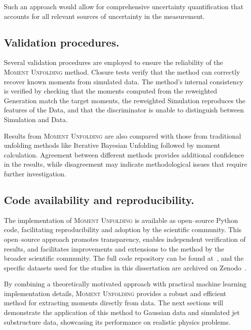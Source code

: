         Such an approach would allow for comprehensive uncertainty quantification that accounts for all relevant sources of uncertainty in the measurement.
    \subsection{Validation procedures.}
        Several validation procedures are employed to ensure the reliability of the \textsc{Moment Unfolding} method.
        Closure tests verify that the method can correctly recover known moments from simulated data.
        The method's internal consistency is verified by checking that the moments computed from the reweighted Generation match the target moments,
        the reweighted Simulation reproduces the features of the Data, and
        that the discriminator is unable to distinguish between Simulation and Data.
        
        Results from \textsc{Moment Unfolding} are also compared with those from traditional unfolding methods like Iterative Bayesian Unfolding followed by moment calculation.
        Agreement between different methods provides additional confidence in the results, while disagreement may indicate methodological issues that require further investigation.
    \subsection{Code availability and reproducibility.}
        The implementation of \textsc{Moment Unfolding} is available as open--source Python code, facilitating reproducibility and adoption by the scientific community.
        This open--source approach promotes transparency, enables independent verification of results, and facilitates improvements and extensions to the method by the broader scientific community.
        The full code repository can be found at~\cite{HEP-GAN/MomentUnfolding:Method}, and the specific datasets used for the studies in this dissertation are archived on Zenodo~\cite{AndreassenPythia/HerwigUnfolding}.

    By combining a theoretically motivated approach with practical machine learning implementation details, \textsc{Moment Unfolding} provides a robust and efficient method for extracting moments directly from data.
    The next sections will demonstrate the application of this method to Gaussian data and simulated jet substructure data, showcasing its performance on realistic physics problems.
    
